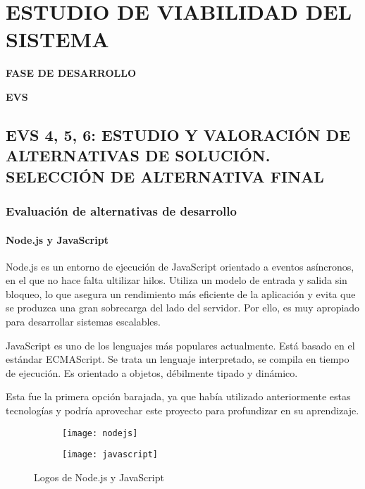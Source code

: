 \newpage
\chapter{ESTUDIO DE VIABILIDAD DEL SISTEMA}
	\vspace{2cm}	
	\begin{center}
	{\Large \textbf{FASE DE DESARROLLO} \par}
	\end{center}
	\vspace{5cm}
	
	\begin{center}
	\Huge \textbf{EVS}\par
	\end{center}\newpage
\section{EVS 4, 5, 6: ESTUDIO Y VALORACIÓN DE ALTERNATIVAS DE SOLUCIÓN. SELECCIÓN DE ALTERNATIVA FINAL}

\subsection{Evaluación de alternativas de desarrollo} 
\subsubsection{Node.js y JavaScript}
Node.js es un entorno de ejecución de JavaScript orientado a eventos asíncronos, en el que no hace falta ultilizar hilos. Utiliza un modelo de entrada y salida sin bloqueo, lo que asegura un rendimiento más eficiente de la aplicación y evita que se produzca una gran sobrecarga del lado del servidor. Por ello, es muy apropiado para desarrollar sistemas escalables\cite{NodeJS}.\\
\par JavaScript es uno de los lenguajes más populares actualmente. Está basado en el estándar ECMAScript. Se trata un lenguaje interpretado, se compila en tiempo de ejecución. Es orientado a objetos, débilmente tipado y dinámico\cite{JavaScript}.\\
\par Esta fue la primera opción barajada, ya que había utilizado anteriormente estas tecnologías y podría aprovechar este proyecto para profundizar en su aprendizaje.
\begin{figure}[H]
	\begin{subfigure}{0.5\textwidth}
	\centering
	\texttt{[image: nodejs]}
	\end{subfigure}
	\begin{subfigure}{0.5\textwidth}
	\centering
	\texttt{[image: javascript]}
	\end{subfigure}
	\caption{Logos de Node.js y JavaScript}
\end{figure}

